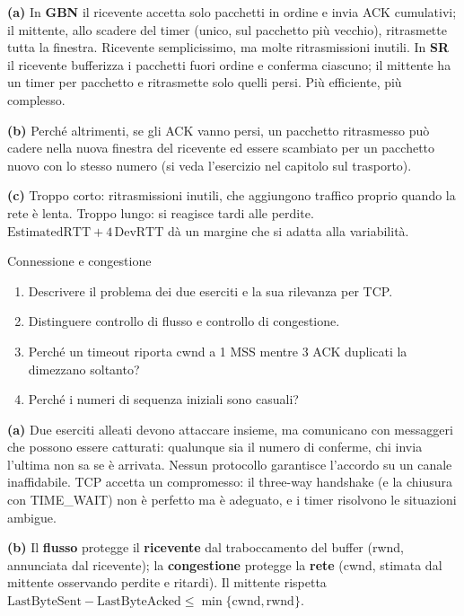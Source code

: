\svolgimento
\textbf{(a)} In \textbf{GBN} il ricevente accetta solo pacchetti in ordine e invia ACK cumulativi; il mittente, allo scadere del timer
(unico, sul pacchetto più vecchio), ritrasmette tutta la finestra. Ricevente semplicissimo, ma molte ritrasmissioni inutili. In
\textbf{SR} il ricevente bufferizza i pacchetti fuori ordine e conferma ciascuno; il mittente ha un timer per pacchetto e ritrasmette solo
quelli persi. Più efficiente, più complesso.

\textbf{(b)} Perché altrimenti, se gli ACK vanno persi, un pacchetto ritrasmesso può cadere nella nuova finestra del ricevente ed essere
scambiato per un pacchetto nuovo con lo stesso numero (si veda l'esercizio nel capitolo sul trasporto).

\textbf{(c)} Troppo corto: ritrasmissioni inutili, che aggiungono traffico proprio quando la rete è lenta. Troppo lungo: si reagisce tardi
alle perdite. $\text{EstimatedRTT} + 4\,\text{DevRTT}$ dà un margine che si adatta alla variabilità.

\begin{esercizio}{Connessione e congestione}
\begin{enumerate}[label=(\alph*)]
    \item Descrivere il problema dei due eserciti e la sua rilevanza per TCP.
    \item Distinguere controllo di flusso e controllo di congestione.
    \item Perché un timeout riporta cwnd a 1 MSS mentre 3 ACK duplicati la dimezzano soltanto?
    \item Perché i numeri di sequenza iniziali sono casuali?
\end{enumerate}
\end{esercizio}

\svolgimento
\textbf{(a)} Due eserciti alleati devono attaccare insieme, ma comunicano con messaggeri che possono essere catturati: qualunque sia il
numero di conferme, chi invia l'ultima non sa se è arrivata. Nessun protocollo garantisce l'accordo su un canale inaffidabile. TCP accetta
un compromesso: il three-way handshake (e la chiusura con TIME\_WAIT) non è perfetto ma è adeguato, e i timer risolvono le situazioni
ambigue.

\textbf{(b)} Il \textbf{flusso} protegge il \textbf{ricevente} dal traboccamento del buffer (rwnd, annunciata dal ricevente); la
\textbf{congestione} protegge la \textbf{rete} (cwnd, stimata dal mittente osservando perdite e ritardi). Il mittente rispetta
$\text{LastByteSent} - \text{LastByteAcked} \le \min\{\text{cwnd}, \text{rwnd}\}$.

